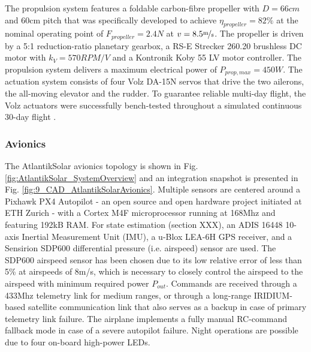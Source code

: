 The propulsion system features a foldable carbon-fibre propeller with $D=66cm$ and 60cm pitch that was specifically developed to achieve $\eta_{propeller}=82\%$ at the nominal operating point of $F_{propeller}=2.4N$ at $v=8.5\unitfrac{m}{s}$. The propeller is driven by a 5:1 reduction-ratio planetary gearbox, a RS-E Strecker 260.20 brushless DC motor with $k_V=570RPM/V$ and a Kontronik Koby 55 LV motor controller. The propulsion system delivers a maximum electrical power of $P_{prop,max}=450W$. The actuation system consists of four Volz DA-15N servos that drive the two ailerons, the all-moving elevator and the rudder. To guarantee reliable multi-day flight, the Volz actuators were successfully bench-tested throughout a simulated continuous 30-day flight \cite{DellaCa_BT}.

\subsubsection{Avionics}

The AtlantikSolar avionics topology is shown in Fig. \ref{fig:AtlantikSolar_SystemOverview} and an integration snapshot is presented in Fig. \ref{fig:9_CAD_AtlantikSolarAvionics}. Multiple sensors are centered around a Pixhawk PX4 Autopilot - an open source and open hardware project initiated at ETH Zurich - with a Cortex M4F microprocessor running at 168Mhz and featuring 192kB RAM. For state estimation (section XXX), an ADIS 16448 10-axis Inertial Measurement Unit (IMU), a u-Blox LEA-6H GPS receiver, and a Sensirion SDP600 differential pressure (i.e. airspeed) sensor are used. The SDP600 airspeed sensor has been chosen due to its low relative error of less than 5\% at airspeeds of 8m/s, which is necessary to closely control the airspeed to the airspeed with minimum required power $P_{out}$. Commands are received through a 433Mhz telemetry link for medium ranges, or through a long-range IRIDIUM-based satellite communication link that also serves as a backup in case of primary telemetry link failure. The airplane implements a fully manual RC-command fallback mode in case of a severe autopilot failure. Night operations are possible due to four on-board high-power LEDs.

